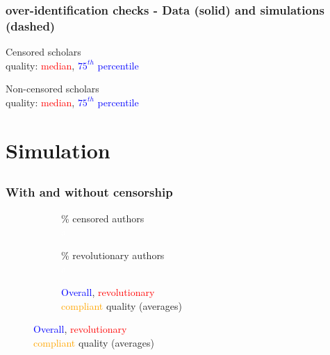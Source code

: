 \documentclass[usepdftitle=false,aspectratio=169,xcolor=dvipsnames]{beamer}
\begin{document}
	\begin{frame}
\frametitle{over-identification checks - Data (solid) and simulations (dashed)}

\parbox{.49\textwidth}{
		\centering
{Censored scholars\\quality: \textcolor{red}{median}, \textcolor{blue}{$75^{th}$ percentile}}

\scalebox{0.45}{ }
}
\parbox{.49\textwidth}{
		\centering
{Non-censored scholars\\
quality: \textcolor{red}{median}, \textcolor{blue}{$75^{th}$ percentile}}

\scalebox{0.45}{}
}

 \end{frame}


	\section{Simulation}
	\subsection{}

	\begin{frame}
\frametitle{With and without censorship}

\begin{figure}
	\begin{subfigure}{.32\textwidth}
		\centering
		\caption{\% censored authors\\\textcolor{white}{a}}
		\label{sf:ca}
		\scalebox{0.34}{ }
	\end{subfigure}
	\begin{subfigure}{.32\textwidth}
		\centering
		\caption{\% revolutionary authors\\\textcolor{white}{a}}
		\label{sf:ra}
		\scalebox{0.34}{ }
	\end{subfigure}
	\begin{subfigure}{.32\textwidth}
		\centering
		\caption{\textcolor{blue}{Overall}, \textcolor{red}{revolutionary}\\ \textcolor{orange}{compliant} quality (averages)}
		\label{sf:dq}
		\scalebox{0.34}{ }
	\end{subfigure}

\end{figure}

 \end{frame}
\end{document}
